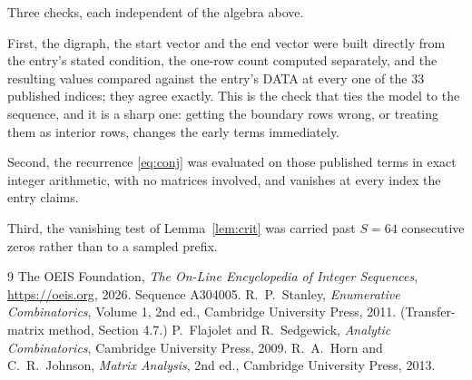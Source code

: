 \documentclass[11pt,a4paper]{article}
\theoremstyle{plain}
\theoremstyle{definition}
\begin{document}
Three checks, each independent of the algebra above.

First, the digraph, the start vector and the end vector were built directly from the
entry's stated condition, the one-row count computed separately, and the resulting values
compared against the entry's DATA at every one of the $33$ published indices; they
agree exactly. This is the check that ties the model to the sequence, and it is a sharp one:
getting the boundary rows wrong, or treating them as interior rows, changes the early terms
immediately.

Second, the recurrence \eqref{eq:conj} was evaluated on those published terms in exact
integer arithmetic, with no matrices involved, and vanishes at every index the entry claims.

Third, the vanishing test of Lemma~\ref{lem:crit} was carried past $S=64$ consecutive
zeros rather than to a sampled prefix.

\begin{thebibliography}{9}
 The OEIS Foundation, \emph{The On-Line Encyclopedia of Integer
Sequences}, \url{https://oeis.org}, 2026. Sequence A304005.
 R.~P.~Stanley, \emph{Enumerative Combinatorics}, Volume 1, 2nd ed.,
Cambridge University Press, 2011. (Transfer-matrix method, Section 4.7.)
 P.~Flajolet and R.~Sedgewick, \emph{Analytic Combinatorics}, Cambridge
University Press, 2009.
 R.~A.~Horn and C.~R.~Johnson, \emph{Matrix Analysis}, 2nd ed., Cambridge
University Press, 2013.
\end{thebibliography}
\end{document}
